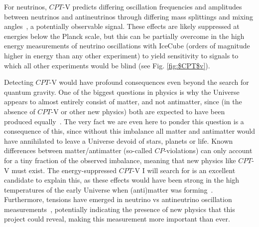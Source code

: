 \documentclass[a4paper,11pt]{article}
\begin{document}
For neutrinos, $CPT$-V predicts differing oscillation frequencies and amplitudes between neutrinos and antineutrinos through differing mass splittings and mixing angles~\cite{Barenboim:2017ewj}, a potentially observable signal. These effects are likely suppressed at energies below the Planck scale, but this can be partially overcome in the high energy measurements of neutrino oscillations with IceCube (orders of magnitude higher in energy than any other experiment) to yield sensitivity to signals to which all other experiments would be blind (see Fig. \ref{fig:$CPT$v}). 

Detecting $CPT$-V would have profound consequences even beyond the search for quantum gravity. One of the biggest questions in physics is why the Universe appears to almost entirely consist of matter, and not antimatter, since (in the absence of $CPT$-V or other new physics) both are expected to have been produced equally~\cite{Sakharov_1991}. The very fact we are even here to ponder this question is a consequence of this, since without this imbalance all matter and antimatter would have annihilated to leave a Universe devoid of stars, planets or life. Known differences between matter/antimatter (so-called $CP$-violations) can only account for a tiny fraction of the observed imbalance, meaning that new physics like $CPT$-V must exist. The energy-suppressed $CPT$-V I will search for is an excellent candidate to explain this, as these effects would have been strong in the high temperatures of the early Universe when (anti)matter was forming~\cite{Mavromatos:2017cxr, hep-ph/9809542, Ellis:2013gca}. Furthermore, tensions have emerged in neutrino vs antineutrino oscillation measurements~\cite{Abe:2019vii,NOvA_CP_result}, potentially indicating the presence of new physics that this project could reveal, making this measurement more important than ever.

\end{document}
